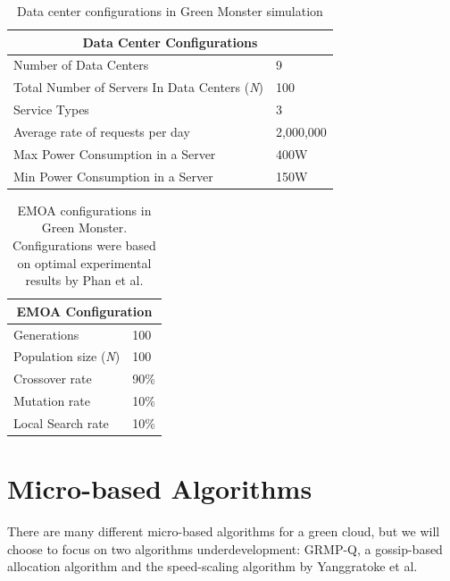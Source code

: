 \documentclass{sig-alternate}
\begin{document}
\begin{table}[tb]
\begin{center}
\begin{tabular}{|l|l|}
    \hline
    \multicolumn{2}{|c|}{\textbf{Data Center Configurations}} \\
    \hline
    Number of Data Centers & 9 \\
    Total Number of Servers In Data Centers (\emph{N}) & 100 \\
    Service Types & 3 \\
    Average rate of requests per day & 2,000,000 \\
    Max Power Consumption in a Server & 400W \\
   	Min Power Consumption in a Server & 150W\\
    \hline
\end{tabular}
\caption{Data center configurations in Green Monster simulation}
\label{tab:DCConfig}
\end{center}
\end{table}

\begin{table}[tb]
\begin{center}
\begin{tabular}{|l|l|}
    \hline
    \multicolumn{2}{|c|}{\textbf{EMOA Configuration}} \\
    \hline
    Generations & 100 \\
    Population size (\emph{N}) & 100 \\
    Crossover rate & 90\% \\
    Mutation rate & 10\% \\
    Local Search rate & 10\% \\
    \hline
\end{tabular}
\caption{EMOA configurations in Green Monster. Configurations were based on optimal experimental results by Phan et al.}
\label{tab:EMOAConfig}
\end{center}
\end{table}



\section{Micro-based Algorithms} 
\label{sec:MicAl}

There are many different micro-based algorithms for a green cloud, but we will choose to focus on two algorithms underdevelopment: GRMP-Q, a gossip-based allocation algorithm and the speed-scaling algorithm by Yanggratoke et al. 
\end{document}

